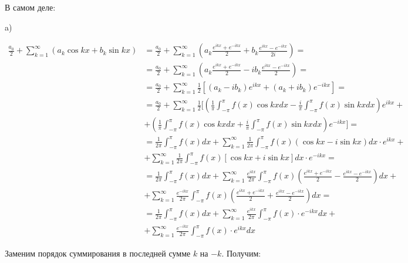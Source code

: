 В самом деле:

a)

\begin{align*}
    \frac{a_0}{2} + \sum_{k = 1}^\infty (a_k \cos kx + b_k \sin kx) &=
    \frac{a_0}{2} + \sum_{k = 1}^\infty \left(
        a_k \frac{e^{ikx} + e^{-ikx}}{2} +
        b_k \frac{e^{ikx} - e^{-ikx}}{2i}
    \right) = \\
    &= \frac{a_0}{2} + \sum_{k = 1}^\infty \left(
        a_k \frac{e^{ikx} + e^{-ikx}}{2} -
        i b_k \frac{e^{ikx} - e^{-ikx}}{2}
    \right) = \\
    &= \frac{a_0}{2} + \sum_{k = 1}^\infty \frac{1}{2} \left[
        (a_k - i b_k) e^{ikx} + (a_k + i b_k) e^{-ikx}
    \right] = \\
    &= \frac{a_0}{2} + \sum_{k = 1}^\infty \frac{1}{2} \Bigg[
        \left( 
            \frac{1}{\pi} \int_{-\pi}^\pi f(x) \cos kx dx -
            \frac{i}{\pi} \int_{-\pi}^\pi f(x) \sin kx dx 
        \right) e^{ikx} + \\
        &+ \left(
            \frac{1}{\pi} \int_{-\pi}^\pi f(x) \cos kx dx +
            \frac{i}{\pi} \int_{-\pi}^\pi f(x) \sin kx dx
        \right) e^{-ikx}
    \Bigg] = \\
    &= \frac{1}{2\pi} \int_{-\pi}^\pi f(x) dx +
        \sum_{k = 1}^\infty \frac{1}{2\pi} \int_{-\pi}^\pi 
        f(x) (\cos kx - i \sin kx) dx \cdot e^{ikx} + \\ &+
        \sum_{k = 1}^\infty \frac{1}{2\pi} \int_{-\pi}^\pi
        f(x) [\cos kx + i \sin kx] dx \cdot e^{-ikx} = \\
    &= \frac{1}{2\pi} \int_{-\pi}^\pi f(x) dx +
        \sum_{k = 1}^\infty \frac{e^{ikx}}{2\pi}
        \int_{-\pi}^\pi f(x) \left(
            \frac{e^{ikx} + e^{-ikx}}{2} -
            \frac{e^{ikx} - e^{-ikx}}{2}
        \right) dx + \\ &+
        \sum_{k = 1}^\infty \frac{e^{-ikx}}{2\pi}
        \int_{-\pi}^\pi f(x) \left(
            \frac{e^{ikx} + e^{-ikx}}{2} +
            \frac{e^{ikx} - e^{-ikx}}{2}
        \right) dx = \\
    &= \frac{1}{2\pi} \int_{-\pi}^\pi f(x) dx +
        \sum_{k = 1}^\infty \frac{e^{ikx}}{2\pi}
        \int_{-\pi}^\pi f(x) \cdot e^{-ikx} dx + \\ &+
        \sum_{k = 1}^\infty \frac{e^{-ikx}}{2\pi}
        \int_{-\pi}^\pi f(x) \cdot e^{ikx} dx
\end{align*}

Заменим порядок суммирования в последней сумме $k$ на $-k$. Получим:

